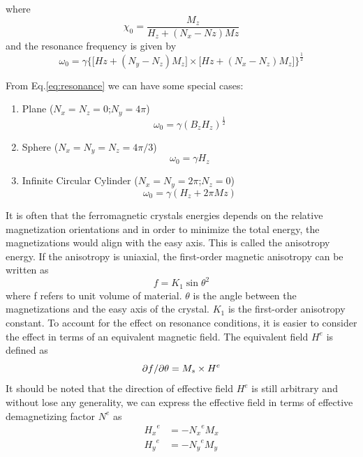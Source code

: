 where
\begin{equation}
    \label{eq:chi0}
    \chi_0 = \frac{M_z}{H_z + (N_x - Nz)Mz}
\end{equation}
and the resonance frequency is given by 
\begin{equation}
    \label{eq:resonance}
    \omega_0 = \gamma \big\{ \big[Hz+(N_y - N_z)M_z] \times \big[Hz+(N_x - N_z)M_z]          \big\}^\frac{1}{2}
\end{equation}

From Eq.\ref{eq:resonance} we can have some special cases:
\begin{enumerate}
  \item Plane ($N_x = N_z = 0$;$N_y = 4 \pi$)
  \begin{equation}
      \omega_0 = \gamma (B_z H_z)^\frac{1}{2}
  \end{equation}
  \item Sphere ($N_x = N_y = N_z = 4\pi/3$)
  \begin{equation}
      \omega_0 = \gamma H_z
  \end{equation}
  \item Infinite Circular Cylinder ($N_x = N_y = 2\pi$;$N_z = 0 $)
  \begin{equation}
      \omega_0 = \gamma (H_z+2\pi Mz)
  \end{equation}
\end{enumerate}
It is often that the ferromagnetic crystals energies depends on the relative magnetization orientations and in order to minimize the total energy, the magnetizations would align with the easy axis. This is called the anisotropy energy. If the anisotropy is uniaxial, the first-order magnetic anisotropy can be written as 
\begin{equation}
    f = K_1 {\sin{\theta}}^2
\end{equation}
where f refers to unit volume of material. $\theta$ is the angle between the magnetizations and the easy axis of the crystal. $K_1$ is the first-order anisotropy constant. To account for the effect on resonance conditions, it is easier to consider the effect in terms of an equivalent magnetic field. The equivalent field $H^e$ is defined as
\begin{equation}
    \partial f \char`\/ \partial \theta = M_s \times H^e
\end{equation}
It should be noted that the direction of effective field $H^e$ is still arbitrary and without lose any generality, we can express the effective field in terms of effective demagnetizing factor $N^e$ as
\begin{equation}
    \begin{aligned}
        {H_x}^e &= - {N_x}^e M_x \\
        {H_y}^e &= - {N_y}^e M_y \\
    \end{aligned}
\end{equation}
